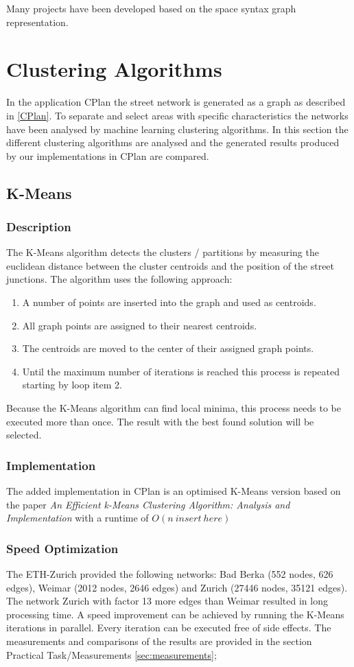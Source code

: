 \documentclass[11pt, a4paper]{report}
\begin{document}
Many projects have been developed based on the space syntax graph representation. 

\pagebreak
\chapter{Clustering Algorithms}
In the application CPlan the street network is generated as a graph as described in \ref{CPlan}. To separate and select areas with specific characteristics the networks have been analysed by machine learning clustering algorithms. In this section the different clustering algorithms are analysed and the generated results produced by our implementations in CPlan are compared.
\section{K-Means}
\subsection{Description}
The K-Means algorithm detects the clusters / partitions by measuring the euclidean distance between the cluster centroids and the position of the street junctions. The algorithm uses the following approach:

\begin{enumerate}
    \item A number of points are inserted into the graph and used as centroids.
    \item All graph points are assigned to their nearest centroids.
    \item The centroids are moved to the center of their assigned graph points.
    \item Until the maximum number of iterations is reached this process is repeated starting by loop item 2.
\end{enumerate}
Because the K-Means algorithm can find local minima, this process needs to be executed more than once. The result with the best found solution will be selected.

\subsection{Implementation}
The added implementation in CPlan\citep{cPlan:2015} is an optimised K-Means version based on the paper \textit{An Efficient k-Means Clustering Algorithm: Analysis and Implementation} \cite{kmeans:2002} with a runtime of $O(n\ insert\ here)$

\subsection{Speed Optimization}
The ETH-Zurich provided the following networks: Bad Berka (552 nodes, 626 edges), Weimar (2012 nodes, 2646 edges) and Zurich (27446 nodes, 35121 edges). The network Zurich with factor 13 more edges than Weimar resulted in long processing time. A speed improvement can be achieved by running the K-Means iterations in parallel. Every iteration can be executed free of side effects. The measurements and comparisons of the results are provided in the section Practical Task/Measurements \ref{sec:measurements};
\end{document}
